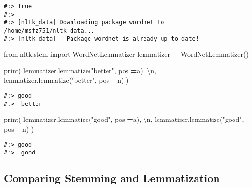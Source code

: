 \documentclass[
]{book}
\newenvironment{Shaded}{\begin{snugshade}}{\end{snugshade}}
\newcommand{\BuiltInTok}[1]{#1}
\newcommand{\CharTok}[1]{\textcolor[rgb]{0.5,0.5,0.5}{#1}}
\newcommand{\ImportTok}[1]{#1}
\newcommand{\NormalTok}[1]{#1}
\newcommand{\OperatorTok}[1]{\textcolor[rgb]{0.43,0.43,0.43}{\textbf{#1}}}
\newcommand{\StringTok}[1]{\textcolor[rgb]{0.5,0.5,0.5}{#1}}
\begin{document}
\begin{verbatim}
#:> True
#:> 
#:> [nltk_data] Downloading package wordnet to /home/msfz751/nltk_data...
#:> [nltk_data]   Package wordnet is already up-to-date!
\end{verbatim}

\begin{Shaded}
\begin{Highlighting}[]
\ImportTok{from}\NormalTok{ nltk.stem }\ImportTok{import}\NormalTok{ WordNetLemmatizer}
\NormalTok{lemmatizer }\OperatorTok{=}\NormalTok{ WordNetLemmatizer()}

\BuiltInTok{print}\NormalTok{( lemmatizer.lemmatize(}\StringTok{"better"}\NormalTok{, pos }\OperatorTok{=}\StringTok{\textquotesingle{}a\textquotesingle{}}\NormalTok{), }\StringTok{\textquotesingle{}}\CharTok{\textbackslash{}n}\StringTok{\textquotesingle{}}\NormalTok{,}
\NormalTok{       lemmatizer.lemmatize(}\StringTok{"better"}\NormalTok{, pos }\OperatorTok{=}\StringTok{\textquotesingle{}n\textquotesingle{}}\NormalTok{) )}
\end{Highlighting}
\end{Shaded}

\begin{verbatim}
#:> good 
#:>  better
\end{verbatim}

\begin{Shaded}
\begin{Highlighting}[]
\BuiltInTok{print}\NormalTok{( lemmatizer.lemmatize(}\StringTok{"good"}\NormalTok{, pos }\OperatorTok{=}\StringTok{\textquotesingle{}a\textquotesingle{}}\NormalTok{), }\StringTok{\textquotesingle{}}\CharTok{\textbackslash{}n}\StringTok{\textquotesingle{}}\NormalTok{,}
\NormalTok{       lemmatizer.lemmatize(}\StringTok{"good"}\NormalTok{, pos }\OperatorTok{=}\StringTok{\textquotesingle{}n\textquotesingle{}}\NormalTok{) )}
\end{Highlighting}
\end{Shaded}

\begin{verbatim}
#:> good 
#:>  good
\end{verbatim}

\hypertarget{comparing-stemming-and-lemmatization}{%
\subsection{Comparing Stemming and Lemmatization}\label{comparing-stemming-and-lemmatization}}
\end{document}

